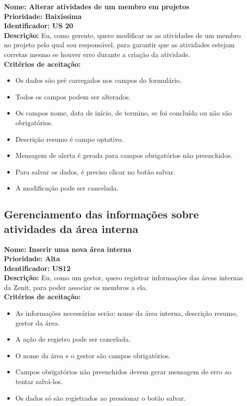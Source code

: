\begin{anexosenv}
\textbf{Nome: Alterar atividades de um membro em projetos\\
Prioridade: Baixíssima\\
Identificador: US 20\\
Descrição: }Eu, como gerente, quero modificar as as atividades de um membro no projeto pelo qual sou responsável, para garantir que as atividades estejam corretas mesmo se houver erro durante a criação da atividade.\\
\textbf{Critérios de aceitação:}
\begin{itemize}
    \item Os dados são pré carregados nos campos do formulário.
    \item Todos os campos podem ser alterados.
    \item Os campos nome, data de início, de termino, se foi concluída ou não são obrigatórios.
    \item Descrição resumo é campo optativo.
    \item Mensagem de alerta é gerada para campos obrigatórios não preenchidos.
    \item Para salvar os dados, é preciso clicar no botão salvar.
    \item A modificação pode ser cancelada.
\end{itemize}

\subsection{Gerenciamento das informações sobre atividades da área interna}

\textbf{Nome: Inserir uma nova área interna\\
Prioridade: Alta\\
Identificador: US12\\
Descrição:} Eu, como um gestor, quero registrar informações das áreas internas da Zenit, para poder associar os membros a ela.\\
\textbf{Critérios de aceitação:}
\begin{itemize}
    \item As informações necessárias serão: nome da área interna, descrição resumo, gestor da área.
    \item A ação de registro pode ser cancelada.
    \item O nome da área e o gestor são campos obrigatórios.
    \item Campos obrigatórios não preenchidos devem gerar mensagem de erro ao tentar salvá-los.
    \item Os dados só são registrados ao pressionar o botão salvar.
\end{itemize}


\end{anexosenv}
